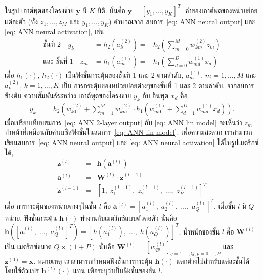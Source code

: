 ในรูป 
เอาต์พุตของโครงข่าย $\mathbf{y}$ มี $K$ มิติ.
นั่นคือ $\mathbf{y} = [y_1, \ldots, y_K]^T$.
ค่าของเอาต์พุตของหน่วยย่อยแต่ละตัว (ทั้ง $z_1, \ldots, z_M$ และ $y_1, \ldots, y_K$) คำนวณจาก สมการ~\ref{eq: ANN neural output} และ \ref{eq: ANN neural activation}, เช่น
\begin{eqnarray}
\mbox{ชั้นที่ 2} \quad
   y_k &= h_2(a^{(2)}_k) =& h_2 \left( \sum_{m=0}^M w^{(2)}_{km} z_m \right)
\nonumber \\
\mbox{และ ชั้นที่ 1} \quad
   z_m &= h_1(a^{(1)}_m) =& h_1\left( \sum_{d=0}^D w^{(1)}_{md} x_d \right)
\nonumber
\end{eqnarray}
เมื่อ $h_1(\cdot)$, $h_2(\cdot)$  เป็นฟังชั่นกระตุ้นของชั้นที่ 1 และ 2 ตามลำดับ,
$a^{(1)}_m$, $m=1,\ldots,M$ และ
$a^{(2)}_k$, $k=1,\ldots,K$ เป็น การกระตุ้นของหน่วยย่อยต่างๆของชั้นที่ 1 และ 2 ตามลำดับ.
จากสมการข้างต้น ความสัมพันธ์ระหว่าง เอาต์พุตของโครงข่าย $y_k$ กับ อินพุต $x_d$ คือ
\begin{eqnarray}
   y_k &=& h_2\left( w^{(2)}_{k0} +\sum_{m=1}^M w^{(2)}_{km} \cdot h_1\left( w^{(1)}_{m0} + \sum_{d=1}^D w^{(1)}_{md} x_d \right) \right).
\label{eq: ANN 2-layer output}
\end{eqnarray}
%
เมื่อเปรียบเทียบสมการ~\ref{eq: ANN 2-layer output} กับ \ref{eq: ANN lin model} จะเห็นว่า $z_m$ ทำหน้าที่เหมือนกับค่าเบซิสฟังชั่นในสมการ~\ref{eq: ANN lin model}.
%
เพื่อความสะดวก เราสามารถเขียนสมการ~\ref{eq: ANN neural output} และ \ref{eq: ANN neural activation} ได้ในรูปเมตริกซ์ได้,
\begin{eqnarray}
\mathbf{z}^{(l)} &=& \mathbf{h}(\mathbf{a}^{(l)})
\label{eq: ANN neural output matrix} \\
\mathbf{a}^{(l)} &=& \mathbf{W}^{(l)} \cdot \mathbf{\dot{z}}^{(l-1)}
\label{eq: ANN neural activation matrix} \\
\mathbf{\dot{z}}^{(l-1)} &=& [1, \; z_1^{(l-1)}, \; z_2^{(l-1)}, \; \ldots, \; z_P^{(l-1)}]^T
\label{eq: ANN neural bias inclusion matrix}
\end{eqnarray}
เมื่อ 
การกระตุ้นของหน่วยต่างๆในชั้น $l$ คือ $\mathbf{a}^{(l)} = [a_1^{(l)}, \; a_2^{(l)}, \;\ldots, \;a_Q^{(l)}]^T$, เมื่อชั้น $l$ มี $Q$ หน่วย.
ฟังชั่นกระตุ้น $\mathbf{h}(\cdot)$ ทำงานกับเมตริกซ์แบบตัวต่อตัว
นั่นคือ $\mathbf{h}([a_1^{(l)}, \;\ldots, \;a_Q^{(l)}]^T) = [h(a_1^{(l)}), \;\ldots, \;h(a_Q^{(l)})]^T$.
น้ำหนักของชั้น $l$ คือ $\mathbf{W}^{(l)}$ เป็น เมตริกซ์ขนาด $Q \times (1+P)$
นั่นคือ $\mathbf{W}^{(l)} = [w_{qp}^{(l)}]_{q=1,\ldots,Q;p=0,\ldots,P}$
และ $\mathbf{z}^{(0)} = \mathbf{x}$.
หมายเหตุ เราสามารถกำหนดฟังชั่นการกระตุ้น $\mathbf{h}(\cdot)$ แตกต่างไปสำหรับแต่ละชั้นได้
โดยใช้ตัวแปร  $\mathbf{h}^{(l)}(\cdot)$ แทน เพื่อระบุว่าเป็นฟังชั่นของชั้น $l$.

